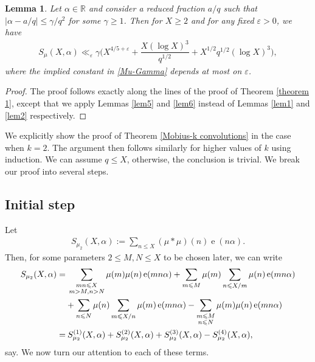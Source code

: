 \documentclass[11pt]{amsart}
\numberwithin{equation}{section}
\numberwithin{figure}{section}
\newtheorem{lemma}{Lemma}[section]
\theoremstyle{definition}
\newcommand{\e}{\operatorname{e}}
\begin{document}
\begin{lemma}\label{Gamma-Mobius}
Let $\alpha\in \mathbb{R}$ and consider a reduced fraction $a/q$ such that $|\alpha-a/q|\leqslant\gamma/q^2$ for some $\gamma \geqslant 1$. Then for $X \geqslant 2$ and for any fixed $\varepsilon>0$, we have
\begin{align}\label{Mu-Gamma}
S_{\mu}(X, \alpha) \ll_{\varepsilon} \gamma \bigg(X^{4/5+\varepsilon}+\dfrac{X(\log X)^3}{q^{1/2}} + X^{1/2}q^{1/2} (\log X)^3\bigg ),
\end{align}
where the implied constant in \eqref{Mu-Gamma} depends at most on $\varepsilon$.
\end{lemma}
\begin{proof}
    The proof follows exactly along the lines of the proof of Theorem \ref{theorem 1}, except that we apply Lemmas \ref{lem5} and \ref{lem6} instead of Lemmas \ref{lem1} and \ref{lem2} respectively.
\end{proof}
We explicitly show the proof of Theorem \ref{Mobius-k convolutions} in the case when $k=2$. The argument then follows similarly for higher values of $k$ using induction. We can assume $q \leqslant X$, otherwise, the conclusion is trivial. We break our proof into several steps.

\subsection{Initial step} Let 
\begin{align*}
    S_{\mu_2}(X, \alpha):=\sum_{n\leqslant X }(\mu*\mu)(n)\e(n\alpha).
\end{align*}
Then, for some parameters $2\leqslant M , N\leqslant X $ to be chosen later, we can write
\begin{align} 
S_{\mu_2}(X, \alpha)=&\: \sum_{\substack{mn\leqslant X \\ m> M, n>N}}\mu(m)\mu(n)\e(mn\alpha) + \sum_{m\leqslant M }\mu(m)\sum_{n\leqslant X /m}\mu(n)\e(mn\alpha)\notag \\
\notag &+\sum_{n\leqslant N}\mu(n)\sum_{m\leqslant X /n}\mu(m)\e(mn\alpha)-\sum_{\substack{m\leqslant M\\ n\leqslant N }}\mu(m)\mu(n)\e(mn\alpha)\\
=&\:  S_{\mu_2}^{(1)}(X, \alpha)+S_{\mu_2}^{(2)}(X, \alpha) + S_{\mu_2}^{(3)}(X, \alpha)-S_{\mu_2}^{(4)}(X, \alpha) \label{Dividing Sums} ,
\end{align}
say. We now turn our attention to each of these terms.
\end{document}
